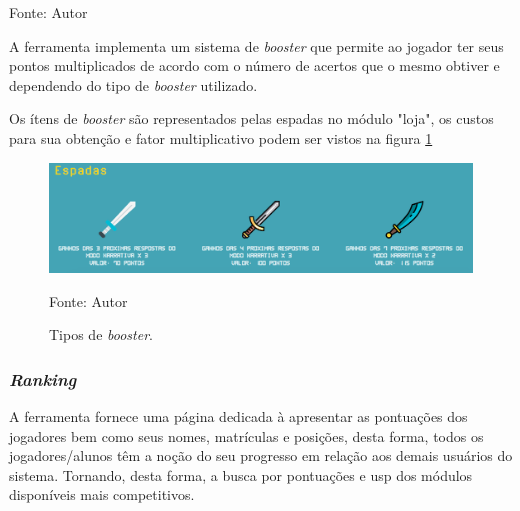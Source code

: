 \begin{table}[h]
	\centering
	\caption{Pontuações}
	\label{pontos}
	Fonte: Autor
\end{table}
\pagebreak 

A ferramenta implementa um sistema de \textit{booster} que permite ao jogador ter seus pontos multiplicados
de acordo com o número de acertos que o mesmo obtiver e dependendo do tipo de \textit{booster} utilizado.

Os ítens de \textit{booster} são representados pelas espadas no módulo "loja", os custos para sua obtenção 
e fator multiplicativo podem ser vistos na figura \ref{espadas}

\begin{figure}[h]
	\centering
	\includegraphics[keepaspectratio=true,scale=0.4]{figuras/espadas.png}
	\caption{Tipos de \textit{booster}.}
	Fonte: Autor
	\label{espadas}
\end{figure}



\subsubsection{\textit{Ranking}}
	A ferramenta fornece uma página dedicada à apresentar as pontuações dos jogadores bem como seus nomes, matrículas e posições, desta forma, todos os jogadores/alunos
 têm a noção do seu progresso em relação aos demais usuários do sistema. Tornando, desta forma, a busca por pontuações e usp dos módulos disponíveis mais competitivos.

